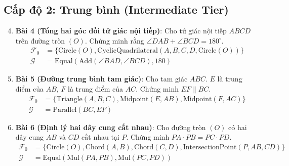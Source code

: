 \subsection*{Cấp độ 2: Trung bình (Intermediate Tier)}
\begin{enumerate}
    \setcounter{enumi}{3}
    \item \textbf{Bài 4 (Tổng hai góc đối tứ giác nội tiếp)}: Cho tứ giác nội tiếp $ABCD$ trên đường tròn $(O)$. Chứng minh rằng $\angle DAB + \angle BCD = 180^\circ$.
    \begin{align*}
        \mathcal{F}_0 &= \{\text{Circle}(O), \text{CyclicQuadrilateral}(A,B,C,D,\text{Circle}(O))\} \\
        \mathcal{G} &= \text{Equal}(\text{Add}(\angle BAD, \angle BCD), 180)
    \end{align*}

    \item \textbf{Bài 5 (Đường trung bình tam giác)}: Cho tam giác $ABC$. $E$ là trung điểm của $AB$, $F$ là trung điểm của $AC$. Chứng minh $EF \parallel BC$.
    \begin{align*}
        \mathcal{F}_0 &= \{\text{Triangle}(A,B,C), \text{Midpoint}(E,AB), \text{Midpoint}(F,AC)\} \\
        \mathcal{G} &= \text{Parallel}(BC, EF)
    \end{align*}

    \item \textbf{Bài 6 (Định lý hai dây cung cắt nhau)}: Cho đường tròn $(O)$ có hai dây cung $AB$ và $CD$ cắt nhau tại $P$. Chứng minh $PA \cdot PB = PC \cdot PD$.
    \begin{align*}
        \mathcal{F}_0 &= \{\text{Circle}(O), \text{Chord}(A,B), \text{Chord}(C,D), \text{IntersectionPoint}(P,AB,CD)\} \\
        \mathcal{G} &= \text{Equal}(\text{Mul}(PA, PB), \text{Mul}(PC, PD))
    \end{align*}
\end{enumerate}

